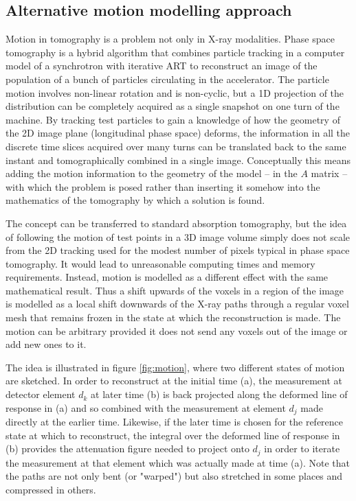 \subsection{Alternative motion modelling approach}

Motion in tomography is a problem not only in X-ray modalities.  Phase space tomography\cite{pstweb} is a hybrid algorithm that combines particle tracking in a computer model of a synchrotron with iterative ART to reconstruct an image of the population of a bunch of particles circulating in the accelerator.  The particle motion involves non-linear rotation and is non-cyclic, but a 1D projection of the distribution can be completely acquired as a single snapshot on one turn of the machine.  By tracking test particles to gain a knowledge of how the geometry of the 2D image plane (longitudinal phase space) deforms, the information in all the discrete time slices acquired over many turns can be translated back to the same instant and tomographically combined in a single image.  Conceptually this means adding the motion information to the geometry of the model -- in the $A$ matrix -- with which the problem is posed rather than inserting it somehow into the mathematics of the tomography by which a solution is found.

The concept can be transferred to standard absorption tomography, but the idea of following the motion of test points in a 3D image volume simply does not scale from the 2D tracking used for the modest number of pixels typical in phase space tomography.  It would lead to unreasonable computing times and memory requirements.  Instead, motion is modelled as a different effect with the same mathematical result.  Thus a shift upwards of the voxels in a region of the image is modelled as a local shift downwards of the X-ray paths through a regular voxel mesh that remains frozen in the state at which the reconstruction is made.  The motion can be arbitrary provided it does not send any voxels out of the image or add new ones to it.

The idea is illustrated in figure \ref{fig:motion}, where two different states of motion are sketched.  In order to reconstruct at the initial time (a), the measurement at detector element $d_k$ at later time (b) is back projected along the deformed line of response in (a) and so combined with the measurement at element $d_j$ made directly at the earlier time.  Likewise, if the later time is chosen for the reference state at which to reconstruct, the integral over the deformed line of response in (b) provides the attenuation figure needed to project onto $d_j$ in order to iterate the measurement at that element which was actually made at time (a).  Note that the paths are not only bent (or "warped") but also stretched in some places and compressed in others.

